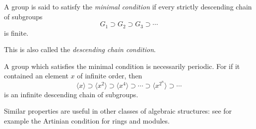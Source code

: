 \documentclass[12pt]{article}
\begin{document}
A group is said to satisfy the \emph{minimal condition} if every strictly descending chain of subgroups
$$G_1 \supset G_2 \supset G_3 \supset \cdots$$
is finite.

This is also called the \emph{descending chain condition}.

A group which satisfies the minimal condition is necessarily periodic.  For if it contained an element $x$ of infinite order, then $$\langle x \rangle \supset \langle x^2 \rangle \supset \langle x^4 \rangle \supset \cdots \supset \langle x^{2^n} \rangle \supset \cdots$$ is an infinite descending chain of subgroups.

Similar properties are useful in other classes of algebraic structures: see for example the Artinian condition for rings and modules.
\end{document}
